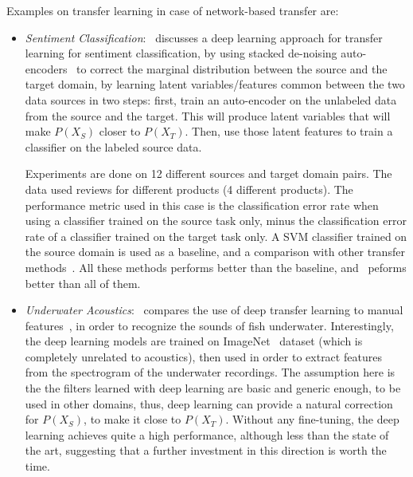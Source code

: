     \par Examples on transfer learning in case of network-based transfer are:
    \begin{itemize}
      \item \textit{Sentiment Classification}:~\citep{glorot2011domain} discusses a deep learning approach for transfer learning for sentiment classification, by using stacked de-noising auto-encoders~\citep{vincent2008extracting} to correct the marginal distribution between the source and the target domain, by learning latent variables/features common between the two data sources in two steps: first, train an auto-encoder on the unlabeled data from the source and the target. This will produce latent variables that will make $P(X_S)$ closer to $P(X_T)$. Then, use those latent features to train a classifier on the labeled source data.

      Experiments are done on 12 different sources and target domain pairs. The data used reviews for different products (4 different products). The performance metric used in this case is the classification error rate when using a classifier trained on the source task only, minus the classification error rate of a classifier trained on the target task only. A SVM classifier trained on the source domain is used as a baseline, and a comparison with other transfer methods~\citep{blitzer2006domain,li2008multi,pan2010cross}. All these methods performs better than the baseline, and~\citep{glorot2011domain} peforms better than all of them.

      \item \textit{Underwater Acoustics}:~\citep{malfante2018use} compares the use of deep transfer learning to manual features~\citep{malfante2016automatic,malfante2018machine}, in order to recognize the sounds of fish underwater. Interestingly, the deep learning models are trained on ImageNet~\citep{imagenet_cvpr09} dataset (which is completely unrelated to acoustics), then used in order to extract features from the spectrogram of the underwater recordings. The assumption here is the the filters learned with deep learning are basic and generic enough, to be used in other domains, thus, deep learning can provide a natural correction for $P(X_S)$, to make it close to $P(X_T)$. Without any fine-tuning, the deep learning achieves quite a high performance, although less than the state of the art, suggesting that a further investment in this direction is worth the time.


\end{itemize}
